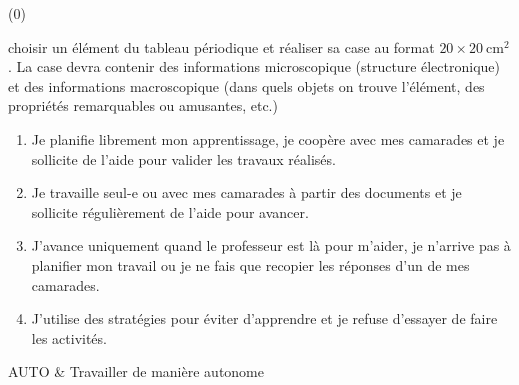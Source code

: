 \vspace*{-354 pt}

\begin{programmeSeance}
\end{programmeSeance}

\begin{programmeSeance}
\end{programmeSeance}

\begin{programmeSeance}[2](0)
\end{programmeSeance}


\begin{tacheFinale}
   choisir un élément du tableau périodique et réaliser sa case au format $20\times\qty{20}{\cm\squared}$.
  La case devra contenir des informations microscopique (structure électronique) et des informations macroscopique (dans quels objets on trouve l'élément, des propriétés remarquables ou amusantes, etc.)
\end{tacheFinale}




\begin{enumerate}[label = \Alph*]
  \item Je planifie librement mon apprentissage, je coopère avec mes camarades et je sollicite de l'aide pour valider les travaux réalisés.
  \item Je travaille seul-e ou avec mes camarades à partir des documents et je sollicite régulièrement de l'aide pour avancer.
  \item J'avance uniquement quand le professeur est là pour m'aider, je n'arrive pas à planifier mon travail ou je ne fais que recopier les réponses d'un de mes camarades.
  \item J'utilise des stratégies pour éviter d'apprendre et je refuse d'essayer de faire les activités.
\end{enumerate}

\begin{tableauCompetences}
  AUTO & Travailler de manière autonome \\
\end{tableauCompetences}